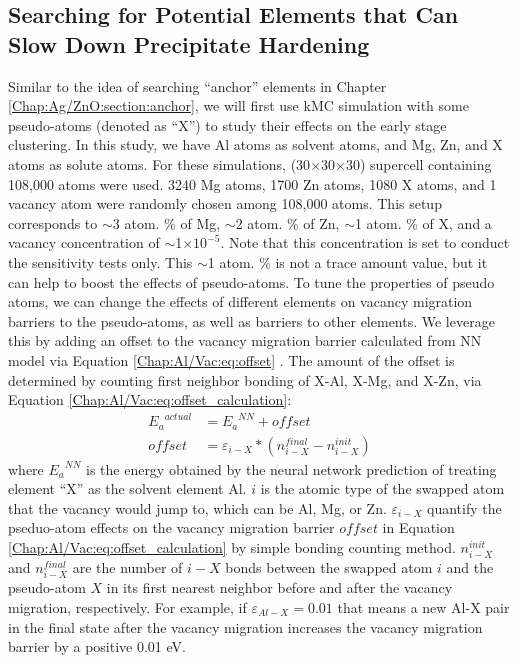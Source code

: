 \subsection{Searching for Potential Elements that Can Slow Down Precipitate Hardening}
\label{Chap:Al/Vac:pseudo}
Similar to the idea of searching ``anchor'' elements in Chapter \ref{Chap:Ag/ZnO:section:anchor}, we will first use \ac{kMC} simulation with some pseudo-atoms (denoted as ``X'') to study their effects on the early stage clustering. In this study, we have Al atoms as solvent atoms, and Mg, Zn, and X atoms as solute atoms. For these simulations, (30$\times$30$\times$30) supercell containing 108,000 atoms were used. 3240 Mg atoms, 1700 Zn atoms, 1080 X atoms, and 1 vacancy atom were randomly chosen among 108,000 atoms. This setup corresponds to $\sim$3 atom. \% of Mg, $\sim$2 atom. \% of Zn, $\sim$1 atom. \% of X, and a vacancy concentration of $\sim$1$\times10^{-5}$. Note that this concentration is set to conduct the sensitivity tests only. This $\sim$1 atom. \% is not a trace amount value, but it can help to boost the effects of pseudo-atoms. To tune the properties of pseudo atoms, we can change the effects of different elements on vacancy migration barriers to the pseudo-atoms, as well as barriers to other elements. We leverage this by adding an offset to the vacancy migration barrier calculated from \ac{NN} model via Equation \ref{Chap:Al/Vac:eq:offset} . The amount of the offset is determined by counting first neighbor bonding of X-Al, X-Mg, and X-Zn, via Equation \ref{Chap:Al/Vac:eq:offset_calculation}:
\begin{subequations}
\begin{align}
{E_a}^{actual} & = {E_a}^{NN} + \textit{offset} \label{Chap:Al/Vac:eq:offset} \\
\textit{offset} & = \varepsilon_{i-X} * ( n_{i-X}^{final} - n_{i-X}^{init}) \label{Chap:Al/Vac:eq:offset_calculation}
\end{align}
\end{subequations}
where ${E_a}^{NN}$ is the energy obtained by the neural network prediction of treating element ``X'' as the solvent element Al. $i$ is the atomic type of the swapped atom that the vacancy would jump to, which can be Al, Mg, or Zn. $\varepsilon_{i-X}$ quantify the pseduo-atom effects on the vacancy migration barrier $offset$ in Equation \ref{Chap:Al/Vac:eq:offset_calculation} by simple bonding counting method. $n_{i-X}^{init}$ and $n_{i-X}^{final}$ are the number of $i-X$ bonds between the swapped atom $i$ and the pseudo-atom $X$ in its first nearest neighbor before and after the vacancy migration, respectively. For example, if $\varepsilon_{Al-X} = 0.01$ that means a new Al-X pair in the final state after the vacancy migration increases the vacancy migration barrier by a positive 0.01 eV.

